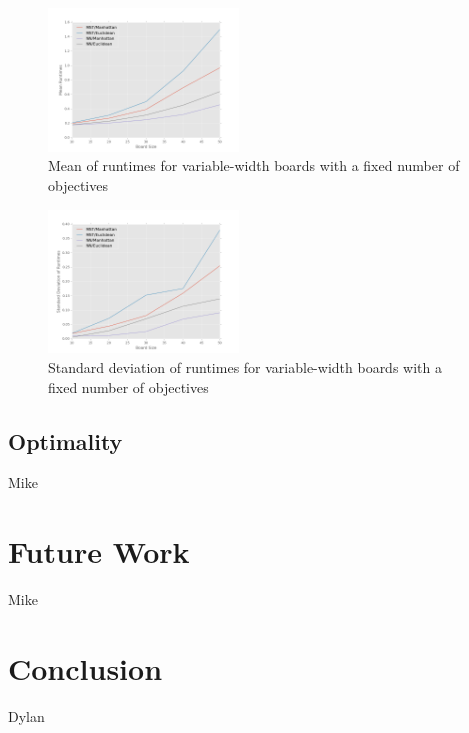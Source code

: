 \documentclass[12pt, conference, compsocconf]{IEEEtran}
\begin{document}
\begin{figure}[h!]
    \centering
    \includegraphics[width=0.45\textwidth]{runtimes.png}
    \caption{Mean of runtimes for variable-width boards with a fixed number of objectives}
    \label{runtimes-fig}
\end{figure}

\begin{figure}[h!]
    \centering
    \includegraphics[width=0.45\textwidth]{variability.png}
    \caption{Standard deviation of runtimes for variable-width boards with a fixed number of objectives}
    \label{variability-fig}
\end{figure}

\subsection{Optimality}
Mike

\section{Future Work}
Mike

\section{Conclusion}
Dylan



\end{document}
